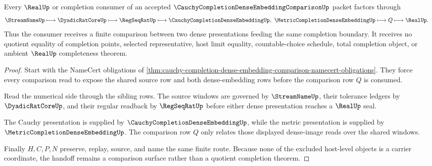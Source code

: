 \begin{theorem}
\label{thm:cauchy-completion-dense-embedding-comparison-handoff}
Every $\RealUp$ or completion consumer of an accepted $\CauchyCompletionDenseEmbeddingComparisonUp$ packet factors through
$$
\StreamNameUp \longmapsto \DyadicRatCoreUp \longmapsto \RegSeqRatUp \longmapsto
\CauchyCompletionDenseEmbeddingUp,\ \MetricCompletionDenseEmbeddingUp \longmapsto
Q \longmapsto \RealUp .
$$
Thus the consumer receives a finite comparison between two dense presentations feeding the same completion boundary. It receives no quotient equality of completion points, selected representative, host limit equality, countable-choice schedule, total completion object, or ambient $\RealUp$ completeness theorem.
\end{theorem}
\begin{proof}
Start with the NameCert obligations of \autoref{thm:cauchy-completion-dense-embedding-comparison-namecert-obligations}. They force every comparison read to expose the shared source row and both dense-embedding rows before the comparison row $Q$ is consumed.

Read the numerical side through the sibling rows. The source windows are governed by $\StreamNameUp$, their tolerance ledgers by $\DyadicRatCoreUp$, and their regular readback by $\RegSeqRatUp$ before either dense presentation reaches a $\RealUp$ seal.

The Cauchy presentation is supplied by $\CauchyCompletionDenseEmbeddingUp$, while the metric presentation is supplied by $\MetricCompletionDenseEmbeddingUp$. The comparison row $Q$ only relates those displayed dense-image reads over the shared windows.

Finally $H,C,P,N$ preserve, replay, source, and name the same finite route. Because none of the excluded host-level objects is a carrier coordinate, the handoff remains a comparison surface rather than a quotient completion theorem.
\end{proof}



